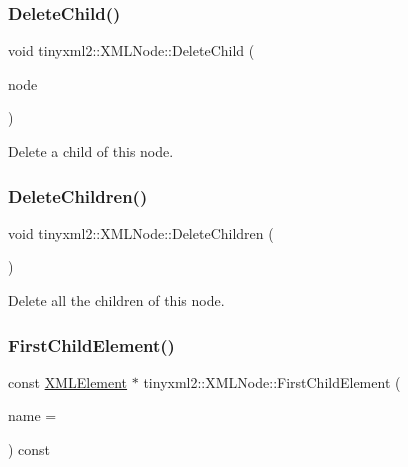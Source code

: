\mbox{\label{classtinyxml2_1_1_x_m_l_node_a363b6edbd6ebd55f8387d2b89f2b0921}} 
\subsubsection{\texorpdfstring{Delete\+Child()}{DeleteChild()}}
{\footnotesize\ttfamily void tinyxml2\+::\+X\+M\+L\+Node\+::\+Delete\+Child (\begin{DoxyParamCaption}\item[{\hyperlink{classtinyxml2_1_1_x_m_l_node}{X\+M\+L\+Node} $\ast$}]{node }\end{DoxyParamCaption})}

Delete a child of this node. \mbox{\label{classtinyxml2_1_1_x_m_l_node_a0360085cc54df5bff85d5c5da13afdce}} 
\subsubsection{\texorpdfstring{Delete\+Children()}{DeleteChildren()}}
{\footnotesize\ttfamily void tinyxml2\+::\+X\+M\+L\+Node\+::\+Delete\+Children (\begin{DoxyParamCaption}{ }\end{DoxyParamCaption})}

Delete all the children of this node. \mbox{\label{classtinyxml2_1_1_x_m_l_node_a1bec132dcf085284e0a10755f2cf0d57}} 
\subsubsection{\texorpdfstring{First\+Child\+Element()}{FirstChildElement()}}
{\footnotesize\ttfamily const \hyperlink{classtinyxml2_1_1_x_m_l_element}{X\+M\+L\+Element} $\ast$ tinyxml2\+::\+X\+M\+L\+Node\+::\+First\+Child\+Element (\begin{DoxyParamCaption}\item[{const char $\ast$}]{name = {} }\end{DoxyParamCaption}) const}

